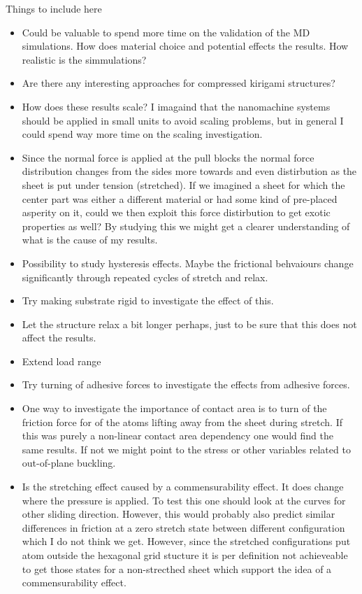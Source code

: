 Things to include here
\begin{itemize}
  \item Could be valuable to spend more time on the validation of the MD simulations. How does material choice and potential effects the results. How realistic is the simmulations?
  \item Are there any interesting approaches for compressed kirigami structures?
  \item How does these results scale? I imagaind that the nanomachine systems should be applied in small units to avoid scaling problems, but in general I could spend way more time on the scaling investigation.
  \item Since the normal force is applied at the pull blocks the normal force distribution changes from the sides more towards and even distirbution as the sheet is put under tension (stretched). If we imagined a sheet for which the center part was either a different material or had some kind of pre-placed asperity on it, could we then exploit this force distirbution to get exotic properties as well? By studying this we might get a clearer understanding of what is the cause of my results. 
  \item Possibility to study hysteresis effects. Maybe the frictional behvaiours change significantly through repeated cycles of stretch and relax. 
  \item Try making substrate rigid to investigate the effect of this. 
  \item Let the structure relax a bit longer perhaps, just to be sure that this does not affect the results. 
  \item Extend load range
  \item Try turning of adhesive forces to investigate the effects from adhesive forces. 
  \item One way to investigate the importance of contact area is to turn of the friction force for of the atoms lifting away from the sheet during stretch. If this was purely a non-linear contact area dependency one would find the same results. If not we might point to the stress or other variables related to out-of-plane buckling.
  \item Is the stretching effect caused by a commensurability effect. It does change where the pressure is applied. To test this one should look at the curves for other sliding direction. However, this would probably also predict similar differences in friction at a zero stretch state between different configuration which I do not think we get. However, since the stretched configurations put atom outside the hexagonal grid stucture it is per definition not achieveable to get those states for a non-strecthed sheet which support the idea of a commensurability effect.

\end{itemize}
